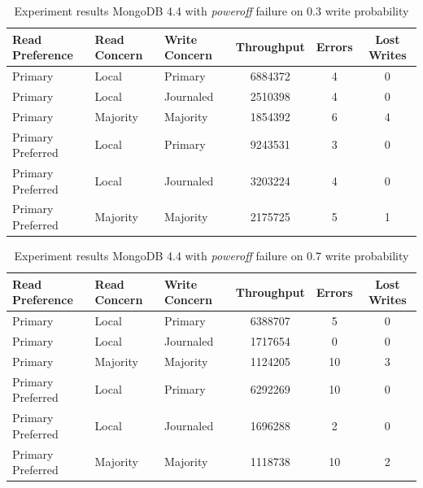 \documentclass[12pt]{article}
\begin{document}
\begin{table}
    \begin{tabular}{@{}lllccc@{}}
      \hline
        Read Preference  & Read Concern & Write Concern & Throughput & Errors & Lost Writes \\
        \hline
        Primary          & Local        & Primary       & 6884372     & 4  & 0        \\
        Primary          & Local        & Journaled     & 2510398     & 4  & 0        \\
        Primary          & Majority     & Majority      & 1854392     & 6  & 4           \\
        Primary Preferred & Local        & Primary       & 9243531     & 3   & 0        \\
        Primary Preferred & Local        & Journaled     & 3203224     & 4    & 0         \\
        Primary Preferred & Majority     & Majority      & 2175725     & 5   & 1           \\
        \hline
        \end{tabular}
    \caption{Experiment results MongoDB 4.4 with \textit{poweroff} failure on 0.3 write probability}
\end{table}

\begin{table}
    \begin{tabular}{@{}lllccc@{}}
      \hline
        Read Preference  & Read Concern & Write Concern & Throughput & Errors & Lost Writes \\
        \hline
        Primary          & Local        & Primary       & 6388707     & 5  & 0        \\
        Primary          & Local        & Journaled     & 1717654     & 0  & 0        \\
        Primary          & Majority     & Majority      & 1124205     & 10  & 3           \\
        Primary Preferred & Local        & Primary       & 6292269     & 10   & 0        \\
        Primary Preferred & Local        & Journaled     & 1696288     & 2    & 0         \\
        Primary Preferred & Majority     & Majority      & 1118738     & 10   & 2           \\
        \hline
        \end{tabular}
    \caption{Experiment results MongoDB 4.4 with \textit{poweroff} failure on 0.7 write probability}
\end{table}
\end{document}
